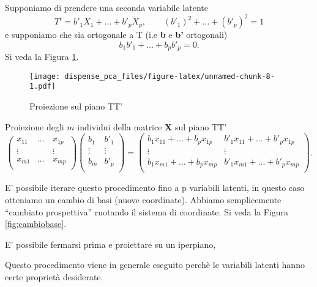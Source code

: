 \documentclass[
  11pt,
]{book}
\begin{document}
Supponiamo di prendere una seconda variabile latente
\begin{equation}
T'=b'_1X_1+\dots+b'_pX_p, \qquad (b'_1)^2+\dots+(b'_p)^2=1
\end{equation}
e supponiamo che sia ortogonale a T (i.e \textbf{b} e \textbf{b'} ortogonali)
\begin{equation}
b_1b'_1+\dots+b_pb'_p=0.
\end{equation}
Si veda la Figura \ref{fig:proiezpiano}.

\begin{figure}
\centering
\texttt{[image: dispense\_pca\_files/figure-latex/unnamed-chunk-8-1.pdf]}
\caption{\label{fig:unnamed-chunk-8}Proiezione sul piano TT' \label{fig:proiezpiano}}
\end{figure}

Proiezione degli \(m\) individui della matrice \textbf{X} sul piano TT'
\begin{equation}
\left(
\begin{array}{cccc}
x_{11}  & \dots & x_{1p} \\
\vdots & \quad & \vdots \\
x_{m1} & \dots & x_{mp} \\
\end{array}
\right)
\left(
\begin{array}{cc}
b_1 & b'_1\\
\vdots & \vdots \\
b_m & b'_p\\
\end{array}
\right)
=
\left(
\begin{array}{cccc}
b_1x_{11}  + \dots +b_p x_{1p} & b'_1x_{11}  + \dots +b'_p x_{1p}\\
\vdots  & \vdots \\
b_1x_{m1} + \dots + b_px_{mp} & b'_1x_{m1} + \dots + b'_px_{mp} \\
\end{array}
\right).
\end{equation}

E' possibile iterare questo procedimento fino a p variabili latenti, in questo caso otteniamo
un cambio di basi (nuove coordinate). Abbiamo semplicemente ``cambiato prospettiva'' ruotando
il sistema di coordinate. Si veda la Figura \ref{fig:cambiobase}.

E' possibile fermarsi prima e proiettare su un
iperpiano,

Questo procedimento viene in generale eseguito perchè le variabili latenti
hanno certe proprietà desiderate.
\end{document}
